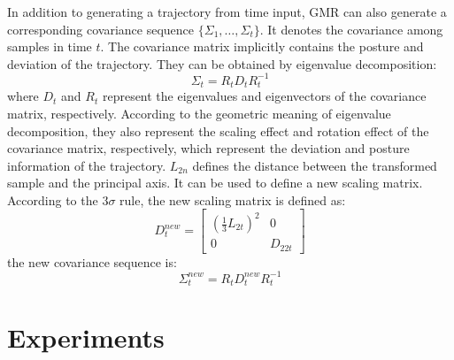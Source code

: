 \documentclass[conference]{IEEEtran}
\begin{document}
In addition to generating a trajectory from time input, GMR can also generate a corresponding covariance sequence $\{\Sigma_1,\hdots,\Sigma_t\}$. It denotes the covariance among samples in time $t$. The covariance matrix implicitly contains the posture and deviation of the trajectory. They can be obtained by eigenvalue decomposition:
\begin{equation}
    \Sigma_t=R_tD_tR_t^{-1}
\end{equation}
where $D_t$ and $R_t$ represent the eigenvalues and eigenvectors of the covariance matrix, respectively. According to the geometric meaning of eigenvalue decomposition, they also represent the scaling effect and rotation effect of the covariance matrix, respectively, which represent the deviation and posture information of the trajectory. $L_{2n}$ defines the distance between the transformed sample and the principal axis. It can be used to define a new scaling matrix. According to the $3\sigma$ rule, the new scaling matrix is defined as:
\begin{equation}
    D_t^{new}=\left[
        \begin{array}{cc}
            (\frac{1}{3}L_{2t})^2 & 0       \\
            0                     & D_{22t}
        \end{array}
        \right]
    \label{eq3}
\end{equation}
the new covariance sequence is:
\begin{equation}
    \Sigma^{new}_t=R_tD^{new}_tR_t^{-1}
\end{equation}



\section{Experiments}
\end{document}
